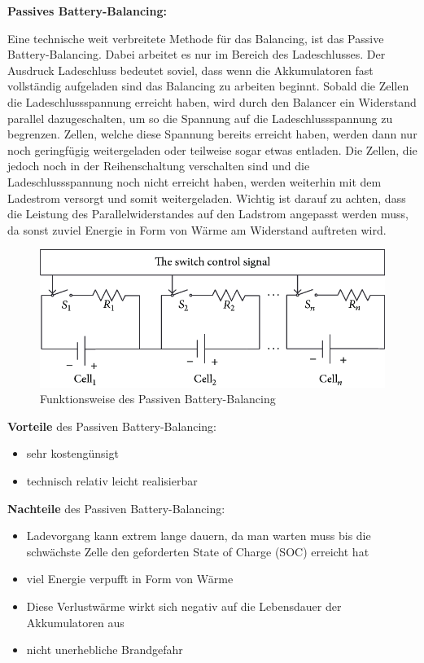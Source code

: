 \textbf{Passives Battery-Balancing:}

Eine technische weit verbreitete Methode für das Balancing, ist das Passive Battery-Balancing. Dabei arbeitet es nur im Bereich des Ladeschlusses. Der Ausdruck Ladeschluss bedeutet soviel, dass wenn die Akkumulatoren fast vollständig aufgeladen sind das Balancing zu arbeiten beginnt. Sobald die Zellen die Ladeschlussspannung erreicht haben, wird durch den Balancer ein Widerstand parallel dazugeschalten, um so die Spannung auf die Ladeschlussspannung zu begrenzen. Zellen, welche diese Spannung bereits erreicht haben, werden dann nur noch geringfügig weitergeladen oder teilweise sogar etwas entladen. Die Zellen, die jedoch noch in der Reihenschaltung verschalten sind und die Ladeschlussspannung noch nicht erreicht haben, werden weiterhin mit dem Ladestrom versorgt und somit weitergeladen. Wichtig ist darauf zu achten, dass die Leistung des Parallelwiderstandes auf den Ladstrom angepasst werden muss, da sonst zuviel Energie in Form von Wärme am Widerstand auftreten wird.

\begin{figure}[H]
	\begin{center}
		\includegraphics[scale=0.5]{figures/Akku/Passive-cell-balancing.png}
		\caption{Funktionsweise des Passiven Battery-Balancing}
	\end{center}
\end{figure}

\textbf{Vorteile} des Passiven Battery-Balancing:
\begin{itemize}
\item {sehr kostengünsigt} \medskip\\
\item {technisch relativ leicht realisierbar} \medskip\\
\end{itemize}

\textbf{Nachteile} des Passiven Battery-Balancing:
\begin{itemize}
\item {Ladevorgang kann extrem lange dauern, da man warten muss bis die schwächste Zelle den geforderten State of Charge (SOC) erreicht hat} \medskip\\
\item {viel Energie verpufft in Form von Wärme} \medskip\\
\item {Diese Verlustwärme wirkt sich negativ auf die Lebensdauer der Akkumulatoren aus} \medskip\\
\item {nicht unerhebliche Brandgefahr} \medskip\\
\end{itemize}
\newpage

